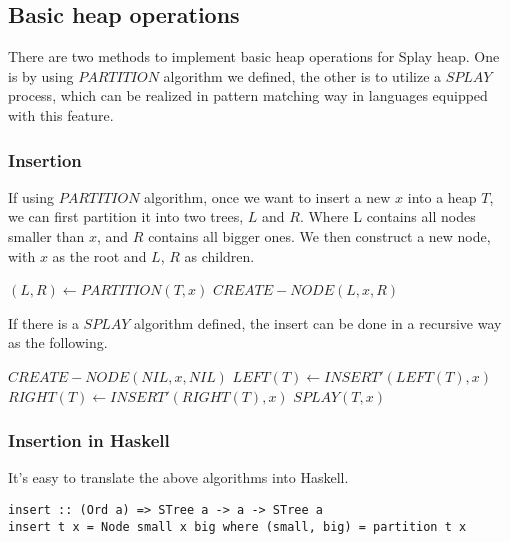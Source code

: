 \documentclass{article}
\begin{document}
\subsection{Basic heap operations}

There are two methods to implement basic heap operations for Splay
heap. One is by using $PARTITION$ algorithm we defined, the other
is to utilize a $SPLAY$ process, which can be realized in pattern matching
way in languages equipped with this feature.

\subsubsection{Insertion}

If using $PARTITION$ algorithm, once we want to insert a new $x$ into
a heap $T$, we can first partition it into two trees, $L$ and $R$. Where
L contains all nodes smaller than $x$, and $R$ contains all bigger ones.
We then construct a new node, with $x$ as the root and $L$, $R$ as children.

\begin{algorithmic}[1]
  \State $(L, R) \gets PARTITION(T, x)$
  \State \Return $CREATE-NODE(L, x, R)$
\EndFunction
\end{algorithmic}

If there is a $SPLAY$ algorithm defined, the insert can be done in a
recursive way as the following.

\begin{algorithmic}[1]
    \State \Return $CREATE-NODE(NIL, x, NIL)$
  \EndIf
    \State $LEFT(T) \gets INSERT'(LEFT(T), x)$
  \Else
    \State $RIGHT(T) \gets INSERT'(RIGHT(T), x)$
  \EndIf
  \State \Return $SPLAY(T, x)$
\EndFunction
\end{algorithmic}

\subsubsection*{Insertion in Haskell}

It's easy to translate the above algorithms into Haskell.

\lstset{language=Haskell}
\begin{lstlisting}
insert :: (Ord a) => STree a -> a -> STree a
insert t x = Node small x big where (small, big) = partition t x
\end{lstlisting}
\end{document}
